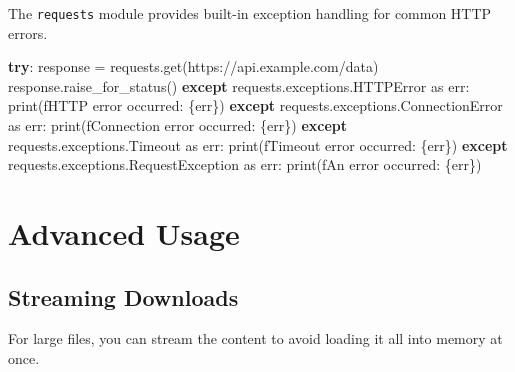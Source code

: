 \documentclass[
  letterpaper,
  DIV=11,
  numbers=noendperiod]{scrreprt}
\newenvironment{Shaded}{\begin{snugshade}}{\end{snugshade}}
\newcommand{\BuiltInTok}[1]{\textcolor[rgb]{0.00,0.23,0.31}{#1}}
\newcommand{\ControlFlowTok}[1]{\textcolor[rgb]{0.00,0.23,0.31}{\textbf{#1}}}
\newcommand{\ImportTok}[1]{\textcolor[rgb]{0.00,0.46,0.62}{#1}}
\newcommand{\NormalTok}[1]{\textcolor[rgb]{0.00,0.23,0.31}{#1}}
\newcommand{\OperatorTok}[1]{\textcolor[rgb]{0.37,0.37,0.37}{#1}}
\newcommand{\PreprocessorTok}[1]{\textcolor[rgb]{0.68,0.00,0.00}{#1}}
\newcommand{\SpecialCharTok}[1]{\textcolor[rgb]{0.37,0.37,0.37}{#1}}
\newcommand{\SpecialStringTok}[1]{\textcolor[rgb]{0.13,0.47,0.30}{#1}}
\newcommand{\StringTok}[1]{\textcolor[rgb]{0.13,0.47,0.30}{#1}}
\begin{document}
The \texttt{requests} module provides built-in exception handling for
common HTTP errors.

\begin{Shaded}
\begin{Highlighting}[]
\ControlFlowTok{try}\NormalTok{:}
\NormalTok{    response }\OperatorTok{=}\NormalTok{ requests.get(}\StringTok{\textquotesingle{}https://api.example.com/data\textquotesingle{}}\NormalTok{)}
\NormalTok{    response.raise\_for\_status()}
\ControlFlowTok{except}\NormalTok{ requests.exceptions.HTTPError }\ImportTok{as}\NormalTok{ err:}
    \BuiltInTok{print}\NormalTok{(}\SpecialStringTok{f\textquotesingle{}HTTP error occurred: }\SpecialCharTok{\{}\NormalTok{err}\SpecialCharTok{\}}\SpecialStringTok{\textquotesingle{}}\NormalTok{)}
\ControlFlowTok{except}\NormalTok{ requests.exceptions.}\PreprocessorTok{ConnectionError} \ImportTok{as}\NormalTok{ err:}
    \BuiltInTok{print}\NormalTok{(}\SpecialStringTok{f\textquotesingle{}Connection error occurred: }\SpecialCharTok{\{}\NormalTok{err}\SpecialCharTok{\}}\SpecialStringTok{\textquotesingle{}}\NormalTok{)}
\ControlFlowTok{except}\NormalTok{ requests.exceptions.Timeout }\ImportTok{as}\NormalTok{ err:}
    \BuiltInTok{print}\NormalTok{(}\SpecialStringTok{f\textquotesingle{}Timeout error occurred: }\SpecialCharTok{\{}\NormalTok{err}\SpecialCharTok{\}}\SpecialStringTok{\textquotesingle{}}\NormalTok{)}
\ControlFlowTok{except}\NormalTok{ requests.exceptions.RequestException }\ImportTok{as}\NormalTok{ err:}
    \BuiltInTok{print}\NormalTok{(}\SpecialStringTok{f\textquotesingle{}An error occurred: }\SpecialCharTok{\{}\NormalTok{err}\SpecialCharTok{\}}\SpecialStringTok{\textquotesingle{}}\NormalTok{)}
\end{Highlighting}
\end{Shaded}

\section{Advanced Usage}\label{advanced-usage}

\subsection{Streaming Downloads}\label{streaming-downloads}

For large files, you can stream the content to avoid loading it all into
memory at once.
\end{document}

